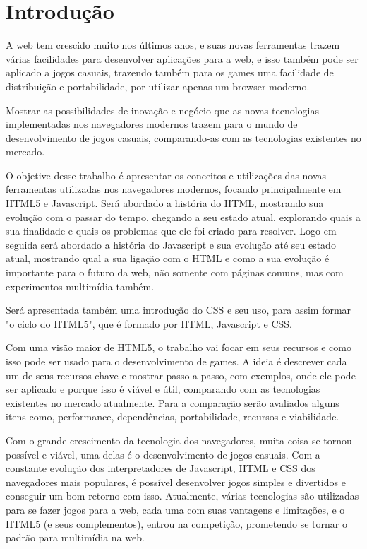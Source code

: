 \section{Introdução}

A web tem crescido muito nos últimos anos, e suas novas ferramentas trazem várias
facilidades para desenvolver aplicações para a web, e isso também pode ser aplicado
a jogos casuais, trazendo também para os games uma facilidade de distribuição e portabilidade,
por utilizar apenas um browser moderno.

Mostrar as possibilidades de inovação e negócio que as novas tecnologias implementadas
nos navegadores modernos trazem para o mundo de desenvolvimento de jogos casuais,
comparando-as com as tecnologias existentes no mercado.

O objetive desse trabalho é apresentar os conceitos e utilizações das novas ferramentas utilizadas
nos navegadores modernos, focando principalmente em HTML5 e Javascript.
Será abordado a história do HTML, mostrando sua evolução com o passar do tempo, chegando
a seu estado atual, explorando quais a sua finalidade e quais os problemas que ele foi criado para resolver.
Logo em seguida será abordado a história do Javascript e sua evolução até seu estado
atual, mostrando qual a sua ligação com o HTML e como a sua evolução é importante
para o futuro da web, não somente com páginas comuns, mas com experimentos multimídia também.

Será apresentada também uma introdução do CSS e seu uso, para assim formar "o ciclo
do HTML5", que é formado por HTML, Javascript e CSS.

Com uma visão maior de HTML5, o trabalho vai focar em seus recursos e como isso pode
ser usado para o desenvolvimento de games. A ideia é descrever cada um de seus recursos
chave e mostrar passo a passo, com exemplos, onde ele pode ser aplicado e porque isso
é viável e útil, comparando com as tecnologias existentes no mercado atualmente. Para
a comparação serão avaliados alguns itens como, performance, dependências, portabilidade, recursos e viabilidade.

Com o grande crescimento da tecnologia dos navegadores, muita coisa se tornou possível
e viável, uma delas é o desenvolvimento de jogos casuais. Com a constante evolução
dos interpretadores de Javascript, HTML e CSS dos navegadores mais populares, é possível
desenvolver jogos simples e divertidos e conseguir um bom retorno com isso. Atualmente,
várias tecnologias são utilizadas para se fazer jogos para a web, cada uma com suas
vantagens e limitações, e o HTML5 (e seus complementos), entrou na competição, prometendo
se tornar o padrão para multimídia na web.

